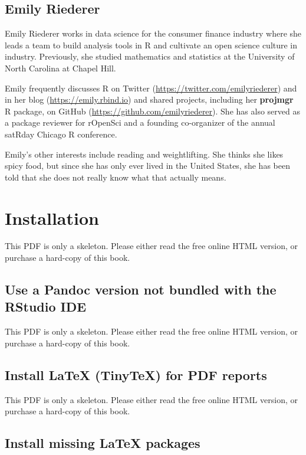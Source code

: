 \documentclass[
  11pt,
]{krantz}
\begin{document}
\hypertarget{emily-riederer}{%
\section*{Emily Riederer}\label{emily-riederer}}


Emily Riederer works in data science for the consumer finance industry where she leads a team to build analysis tools in R and cultivate an open science culture in industry. Previously, she studied mathematics and statistics at the University of North Carolina at Chapel Hill.

Emily frequently discusses R on Twitter (\url{https://twitter.com/emilyriederer}) and in her blog (\url{https://emily.rbind.io}) and shared projects, including her \textbf{projmgr} R package, on GitHub (\url{https://github.com/emilyriederer}). She has also served as a package reviewer for rOpenSci and a founding co-organizer of the annual satRday Chicago R conference.

Emily's other interests include reading and weightlifting. She thinks she likes spicy food, but since she has only ever lived in the United States, she has been told that she does not really know what that actually means.

\mainmatter
\chapter{Installation}\label{installation}

This PDF is only a skeleton. Please either read the free online HTML version, or purchase a hard-copy of this book.

\section{Use a Pandoc version not bundled with the RStudio IDE}\label{install-pandoc}

This PDF is only a skeleton. Please either read the free online HTML version, or purchase a hard-copy of this book.

\section{Install LaTeX (TinyTeX) for PDF reports}\label{install-latex}

This PDF is only a skeleton. Please either read the free online HTML version, or purchase a hard-copy of this book.

\section{Install missing LaTeX packages}\label{install-latex-pkgs}
\end{document}
